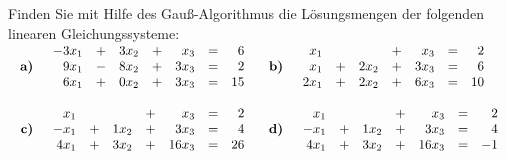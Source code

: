 {
Finden Sie mit Hilfe des Gau\ss-Algorithmus die L\"osungsmengen der folgenden linearen Gleichungssysteme: \\
$\begin{array}{rlrl}
\text{\textbf{ a)}}&\begin{array}{rcrcrcr}
-3x_1&+&3x_2&+&x_3&=&6\\
9x_1&-& 8x_2 &+& 3x_3&=&2\\
6x_1 &+& 0x_2 &+& 3x_3 &=&15
\end{array}&
\text{\textbf{ b)}}&\begin{array}{rcrcrcr}
x_1&&&+&x_3&=&2\\
x_1&+&2x_2&+&3x_3&=&6\\
2x_1&+&2x_2&+&6x_3&=&10
\end{array}\\\\
\text{\textbf{ c)}}&\begin{array}{rcrcrcr}
x_1&&&+&x_3&=&2\\
-x_1&+&1x_2&+&3x_3&=&4\\
4x_1&+&3x_2&+&16x_3&=&26
\end{array}&
\text{\textbf{ d)}}&\begin{array}{rcrcrcr}
x_1&&&+&x_3&=&2\\
-x_1&+&1x_2&+&3x_3&=&4\\
4x_1&+&3x_2&+&16x_3&=&-1
\end{array}
\end{array}$
}
